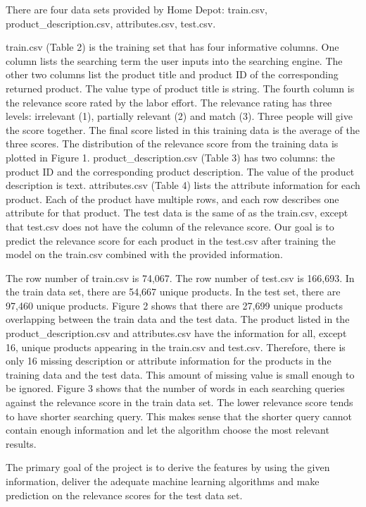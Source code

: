 \documentclass[11pt, titlepage]{article}
\begin{document}
\noindent
There are four data sets provided by Home Depot: train.csv, product\_description.csv, attributes.csv, test.csv. 

\vspace{3mm} 
train.csv (Table 2) is the training set that has four informative columns. One column lists the searching term the user inputs into the searching engine. The other two columns list the product title and product ID of the corresponding returned product. The value type of product title is string. The fourth column is the relevance score rated by the labor effort. The relevance rating has three levels: irrelevant (1), partially relevant (2) and match (3). Three people will give the score together. The final score listed in this training data is the average of the three scores. The distribution of the relevance score from the training data is plotted in Figure 1. product\_description.csv (Table 3) has two columns: the product ID and the corresponding product description. The value of the product description is text. attributes.csv (Table 4) lists the attribute information for each product. Each of the product have multiple rows, and each row describes one attribute for that product. The test data is the same of as the train.csv, except that test.csv does not have the column of the relevance score. Our goal is to predict the relevance score for each product in the test.csv after training the model on the train.csv combined with the provided information.

\vspace{3mm} 
The row number of train.csv is 74,067. The row number of test.csv is 166,693. In the train data set, there are 54,667 unique products. In the test set, there are 97,460 unique products. Figure 2 shows that there are 27,699 unique products overlapping between the train data and the test data. The product listed in the product\_description.csv and attributes.csv have the information for all, except 16, unique products appearing in the train.csv and test.csv. Therefore, there is only 16 missing description or attribute information for the products in the training data and the test data. This amount of missing value is small enough to be ignored. Figure 3 shows that the number of words in each searching queries against the relevance score in the train data set. The lower relevance score tends to have shorter searching query. This makes sense that the shorter query cannot contain enough information and let the algorithm choose the most relevant results. 

\vspace{3mm} 
The primary goal of the project is to derive the features by using the given information, deliver the adequate machine learning algorithms and make prediction on the relevance scores for the test data set. 
\end{document}
